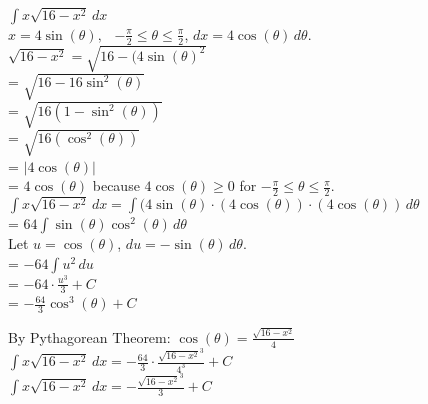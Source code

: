 \documentclass[12pt, letterpaper]{article}
\begin{document}
    \begin{flushleft}
        \hspace{10pt}$\int x\sqrt{16-x^2}\,dx$\\
        \hspace{5pt}$x=4\sin(\theta),\hspace{5pt}$ \hspace{5pt} $-\frac{\pi}{2}\leq\theta\leq\frac{\pi}{2}$,\hspace{5pt} \hspace{5pt} $dx=4\cos(\theta)\,d\theta.$\\
        $\sqrt{16-x^2} = \sqrt{16-(4\sin(\theta)^2} $\\
        \hspace{51pt}= $\sqrt{16-16\sin^2(\theta)}$ \\
        \hspace{51pt}= $\sqrt{16(1-\sin^2(\theta))}$ \\
        \hspace{51pt}= $\sqrt{16(\cos^2(\theta))}$ \\
        \hspace{51pt}= $|4\cos(\theta)|$ \\
        \hspace{51pt}= $4\cos(\theta)$ because $4\cos(\theta)\geq0$ for $-\frac{\pi}{2}\leq\theta\leq\frac{\pi}{2}$.\\
        $\int x\sqrt{16-x^2}\,dx = \int(4\sin(\theta)\cdot(4\cos(\theta))\cdot(4\cos(\theta))\,d\theta$ \\
        \hspace{83pt}= $64\int\sin(\theta)\cos^2(\theta)\,d\theta$ \\
        Let $u=\cos(\theta)$, $du=-\sin(\theta)\,d\theta$. \\
        \hspace{83pt}= $-64\int u^2\,du$ \\
        \hspace{83pt}= $-64\cdot\frac{u^3}{3}+C$ \\
        \hspace{83pt}= $-\frac{64}{3}\cos^3(\theta)+C$ \\
    \end{flushleft}
    \begin{flushleft}
        By Pythagorean Theorem:
        $\cos(\theta)=\frac{\sqrt{16-x^2}}{4}$ \\
        $\int x\sqrt{16-x^2}\,dx=-\frac{64}{3}\cdot\frac{\sqrt{16-x^2}^3}{4^3}+C$\\
        $\int x\sqrt{16-x^2}\,dx=-\frac{\sqrt{16-x^2}^3}{3}+C$\\
    \end{flushleft}
    \newpage
\end{document}
